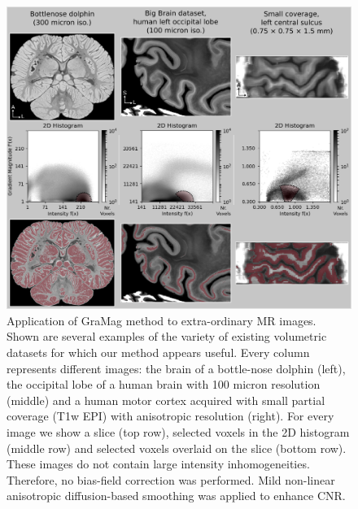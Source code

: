 \begin{figure}[htbp!]
\centering
\includegraphics[width=\textwidth]{figures/chapter_02_SI/supp_specific_cases.png}
\caption{Application of GraMag method to extra-ordinary MR images. Shown are several examples of the variety of existing volumetric datasets for which our method appears useful. Every column represents different images: the brain of a bottle-nose dolphin \parencite{Toro2014} (left), the occipital lobe of a human brain with 100 micron resolution \parencite{Amunts2013} (middle) and a human motor cortex acquired with small partial coverage (T1w EPI) with anisotropic resolution \parencite{Huber2017} (right). For every image we show a slice (top row), selected voxels in the 2D histogram (middle row) and selected voxels overlaid on the slice (bottom row). These images do not contain large intensity inhomogeneities. Therefore, no bias-field correction was performed. Mild non-linear anisotropic diffusion-based smoothing was applied to enhance CNR.}
\label{fig:S4_Fig}
\end{figure}

